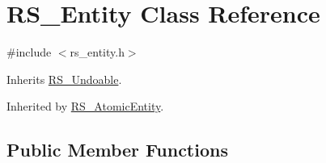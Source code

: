 \hypertarget{class_r_s___entity}{\section{R\-S\-\_\-\-Entity Class Reference}
\label{class_r_s___entity}
}


{\ttfamily \#include $<$rs\-\_\-entity.\-h$>$}



Inherits \hyperlink{class_r_s___undoable}{R\-S\-\_\-\-Undoable}.



Inherited by \hyperlink{class_r_s___atomic_entity}{R\-S\-\_\-\-Atomic\-Entity}.

\subsection*{Public Member Functions}
